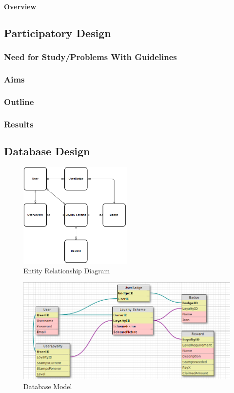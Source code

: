 \textbf{Overview}
\subsection{Participatory Design}
\subsubsection{Need for Study/Problems With Guidelines}
\subsubsection{Aims}
\subsubsection{Outline}
\subsubsection{Results}

\subsection{Database Design}
\begin{figure}[H]
  \centering
    \includegraphics[width=0.5\textwidth]{img/erd.png}
      \caption{Entity Relationship Diagram}
\end{figure}
\begin{figure}[H]
  \centering
    \includegraphics[width=1\textwidth]{img/architecture.png}
      \caption{Database Model}
\end{figure}